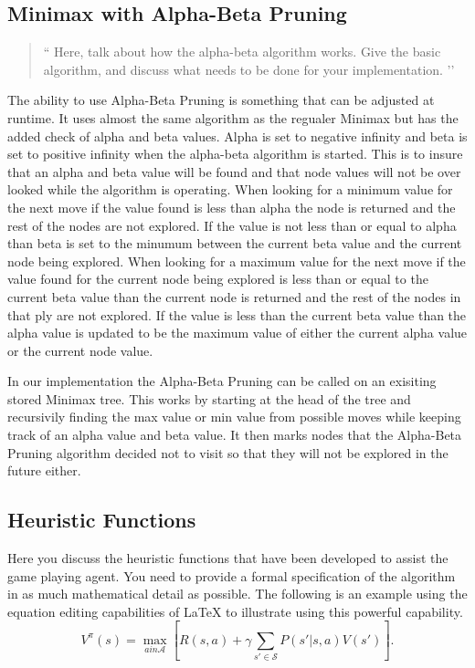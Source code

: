 \documentclass[12pt,letterpaper]{article}
\begin{document}
\subsection{Minimax with Alpha-Beta Pruning}
\begin{quote}
`` 
Here, talk about how the alpha-beta algorithm works.  Give the basic algorithm, and
discuss what needs to be done for your implementation.
’’
\end{quote}
 The ability to use Alpha-Beta Pruning is something that can be adjusted at runtime. It uses almost the same algorithm as the regualer Minimax but has the added check of alpha and beta values. Alpha is set to negative infinity and beta is set to positive infinity when the alpha-beta algorithm is started. This is to insure that an alpha and beta value will be found and that node values will not be over looked while the algorithm is operating. When looking for a minimum value for the next move if the value found is less than alpha the node is returned and the rest of the nodes are not explored. If the value is not less than or equal to alpha than beta is set to the minumum between the current beta value and the current node being explored. When looking for a maximum value for the next move if the value found for the current node being explored is less than or equal to the current beta value than the current node is returned and the rest of the nodes in that ply are not explored. If the value is less than the current beta value than the alpha value is updated to be the maximum value of either the current alpha value or the current node value. 

In our implementation the Alpha-Beta Pruning can be called on an exisiting stored Minimax tree. This works by starting at the head of the tree and recursivily finding the max value or min value from possible moves while keeping track of an alpha value and beta value.  It then marks nodes that the Alpha-Beta Pruning algorithm decided not to visit so that they will not be explored in the future either. 


\subsection{Heuristic Functions}

Here you discuss the heuristic functions that have been developed to assist the
game playing agent. You need to provide a formal specification of the algorithm
in as much mathematical detail as possible. The following is an example using
the equation editing capabilities of \LaTeX{} to illustrate using this powerful capability.
\[
V^\pi(s)=\max_{a in \mathcal{A}} \left[ R(s,a) + \gamma \sum_{s' \in \mathcal{S}} P(s'|s,a) V(s') \right].
\]
\end{document}
